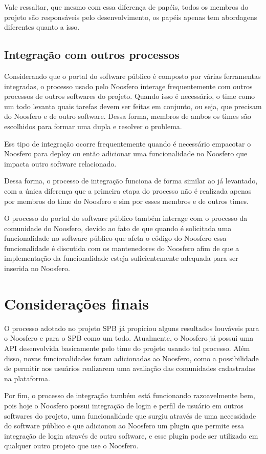 \documentclass[a4paper, 11pt]{article}
\begin{document}
Vale ressaltar, que mesmo com essa diferença de papéis, todos os membros do
projeto são responsáveis pelo desenvolvimento, os papéis apenas tem abordagens
diferentes quanto a isso.


\subsection*{Integração com outros processos}

Considerando que o portal do software público é composto por várias
ferramentas integradas, o processo usado pelo Noosfero interage frequentemente
com outros processos de outros softwares do projeto. Quando isso é necessário,
o time como um todo levanta quais tarefas devem ser feitas em conjunto, ou
seja, que precisam do Noosfero e de outro software. Dessa forma, membros de
ambos os times são escolhidos para formar uma dupla e resolver o problema.

Ess tipo de integração ocorre frequentemente quando é necessário empacotar o
Noosfero para deploy ou então adicionar uma funcionalidade no Noosfero que
impacta outro software relacionado.

Dessa forma, o processo de integração funciona de forma similar ao já
levantado, com a única diferença que a primeira etapa do processo não é
realizada apenas por membros do time do Noosfero e sim por esses membros e de
outros times.

O processo do portal do software público também interage com o processo da
comunidade do Noosfero, devido ao fato de que quando é solicitada uma
funcionalidade no software público que afeta o código do Noosfero essa
funcionalidade é discutida com os mantenedores do Noosfero afim de que a
implementação da funcionalidade esteja suficientemente adequada para ser
inserida no Noosfero.

\section*{Considerações finais}

O processo adotado no projeto SPB já propiciou alguns resultados louváveis
para o Noosfero e para o SPB como um todo. Atualmente, o Noosfero já possui
uma API desenvolvida basicamente pelo time do projeto usando tal processo.
Além disso, novas funcionalidades foram adicionadas ao Noosfero, como a
possibilidade de permitir aos usuários realizarem uma avaliação das
comunidades cadastradas na plataforma.

Por fim, o processo de integração também está funcionando razoavelmente bem,
pois hoje o Noosfero possui integração de login e perfil de usuário em outros
softwares do projeto, uma funcionalidade que surgiu através de uma necessidade
do software público e que adicionou ao Noosfero um plugin que permite essa
integração de login através de outro software, e esse plugin pode ser
utilizado em qualquer outro projeto que use o Noosfero.
\end{document}
